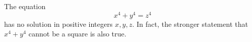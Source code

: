 The equation
$$x^4 + y^4 = z^4$$
has no solution in positive integers $x, y, z$. In fact, the stronger statement that $x^4 + y^4$ cannot be a square is also true.
